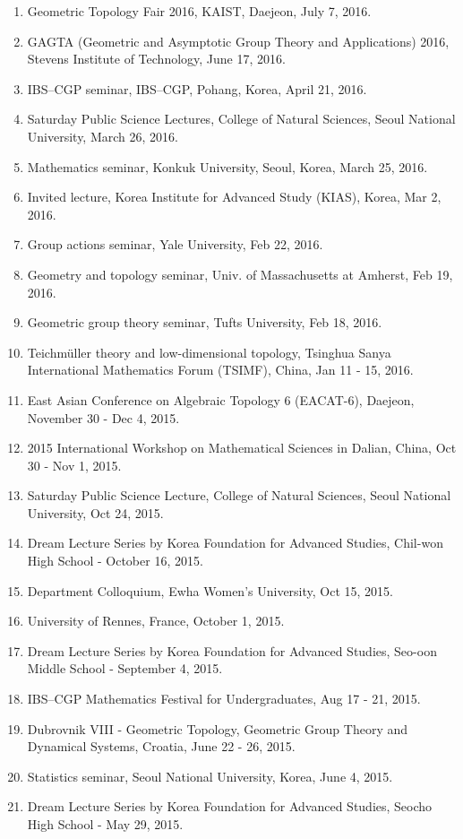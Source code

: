 \documentclass[11pt,a4paper]{article}
\begin{document}
\begin{enumerate}[leftmargin=1.5em, label=\arabic*.]
\item Geometric Topology Fair 2016, KAIST, Daejeon, July 7, 2016.
\item GAGTA (Geometric and Asymptotic Group Theory and Applications) 2016, Stevens Institute of Technology, June 17, 2016.
\item IBS--CGP seminar, IBS--CGP, Pohang, Korea, April 21, 2016.
\item Saturday Public Science Lectures, College of Natural Sciences, Seoul National University, March 26, 2016.
\item Mathematics seminar, Konkuk University, Seoul, Korea, March 25, 2016.
\item Invited lecture, Korea Institute for Advanced Study (KIAS), Korea, Mar 2, 2016.
\item Group actions seminar, Yale University, Feb 22, 2016.
\item Geometry and topology seminar, Univ. of Massachusetts at Amherst, Feb 19, 2016.
\item Geometric group theory seminar, Tufts University, Feb 18, 2016.
\item Teichmüller theory and low-dimensional topology, Tsinghua Sanya International Mathematics Forum (TSIMF), China, Jan 11 - 15, 2016.
\item East Asian Conference on Algebraic Topology 6 (EACAT-6), Daejeon, November 30 - Dec 4, 2015.
\item 2015 International Workshop on Mathematical Sciences in Dalian, China, Oct 30 - Nov 1, 2015.
\item Saturday Public Science Lecture, College of Natural Sciences, Seoul National University, Oct 24, 2015.
\item Dream Lecture Series by Korea Foundation for Advanced Studies, Chil-won High School - October 16, 2015.
\item Department Colloquium, Ewha Women's University, Oct 15, 2015.
\item University of Rennes, France, October 1, 2015.
\item Dream Lecture Series by Korea Foundation for Advanced Studies, Seo-oon Middle School - September 4, 2015.
\item IBS--CGP Mathematics Festival for Undergraduates, Aug 17 - 21, 2015.
\item Dubrovnik VIII - Geometric Topology, Geometric Group Theory and Dynamical Systems, Croatia, June 22 - 26, 2015.
\item Statistics seminar, Seoul National University, Korea, June 4, 2015.
\item Dream Lecture Series by Korea Foundation for Advanced Studies, Seocho High School - May 29, 2015.

\end{enumerate}
\end{document}
